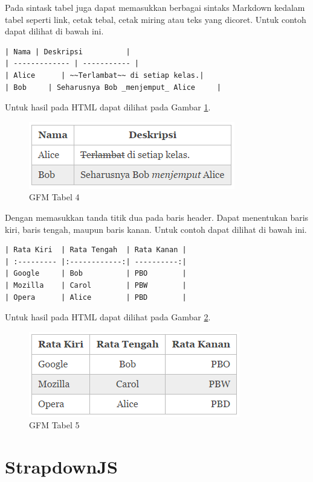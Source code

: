 \begin{itemize}
Pada sintask tabel juga dapat memasukkan berbagai sintaks Markdown kedalam tabel seperti link, cetak tebal, cetak miring atau teks yang dicoret. Untuk contoh dapat dilihat di bawah ini.
\begin{lstlisting}[basicstyle=\footnotesize]
| Nama | Deskripsi          |
| ------------- | ----------- |
| Alice      | ~~Terlambat~~ di setiap kelas.|
| Bob     | Seharusnya Bob _menjemput_ Alice     |
\end{lstlisting}
Untuk hasil pada HTML dapat dilihat pada Gambar \ref{fig:t4}.
\begin{figure}[H]
\centering
\includegraphics[scale=1]{Gambar/t4.png}
\caption[GFM Tabel 4]{GFM Tabel 4}
\label{fig:t4}
\end{figure}

Dengan memasukkan tanda titik dua pada baris header. Dapat menentukan baris kiri,
baris tengah, maupun baris kanan. Untuk contoh dapat dilihat di bawah ini.
\begin{lstlisting}[basicstyle=\footnotesize]
| Rata Kiri  | Rata Tengah  | Rata Kanan |
| :--------- |:------------:| ----------:|
| Google     | Bob          | PBO        |
| Mozilla    | Carol        | PBW        |
| Opera      | Alice        | PBD        |
\end{lstlisting}
Untuk hasil pada HTML dapat dilihat pada Gambar \ref{fig:t5}.
\begin{figure}[H]
\centering
\includegraphics[scale=1]{Gambar/t5.png}
\caption[GFM Tabel 5]{GFM Tabel 5}
\label{fig:t5}
\end{figure}
\end{itemize}

\section{StrapdownJS \cite{Strapdownjs:2014}}
\label{sec:stapdownjs}

